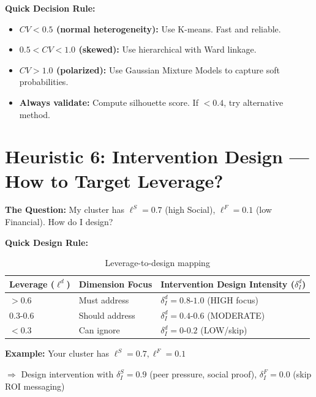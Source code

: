 \textbf{Quick Decision Rule:}

\begin{itemize}[nosep]
\item \textbf{$CV < 0.5$ (normal heterogeneity):} Use K-means. Fast and reliable.
\item \textbf{$0.5 < CV < 1.0$ (skewed):} Use hierarchical with Ward linkage.
\item \textbf{$CV > 1.0$ (polarized):} Use Gaussian Mixture Models to capture soft probabilities.
\item \textbf{Always validate:} Compute silhouette score. If $< 0.4$, try alternative method.
\end{itemize}


\section{Heuristic 6: Intervention Design --- How to Target Leverage?}
\label{sec:h6-intervention-design}

\textbf{The Question:} My cluster has $\ell^S = 0.7$ (high Social), $\ell^F = 0.1$ (low Financial). How do I design?

\textbf{Quick Design Rule:}

\begin{table}[h]
\centering
\small
\begin{tabular}{lll}
\toprule
\textbf{Leverage ($\ell^d$)} & \textbf{Dimension Focus} & \textbf{Intervention Design Intensity ($\delta_I^d$)} \\
\midrule
$> 0.6$ & Must address & $\delta_I^d = 0.8$-$1.0$ (HIGH focus) \\
$0.3$-$0.6$ & Should address & $\delta_I^d = 0.4$-$0.6$ (MODERATE) \\
$< 0.3$ & Can ignore & $\delta_I^d = 0$-$0.2$ (LOW/skip) \\
\bottomrule
\end{tabular}
\caption{Leverage-to-design mapping}
\label{tab:h6-design}
\end{table}

\textbf{Example:} Your cluster has $\ell^S = 0.7, \ell^F = 0.1$

$\Rightarrow$ Design intervention with $\delta_I^S = 0.9$ (peer pressure, social proof), $\delta_I^F = 0.0$ (skip ROI messaging)

